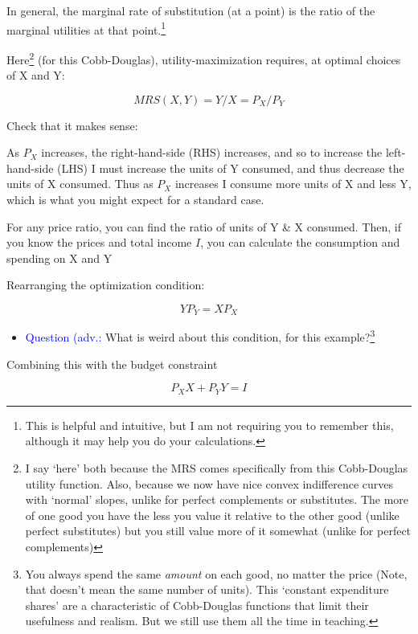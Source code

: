 \documentclass[]{article}
\providecommand{\tightlist}{%
  \setlength{\itemsep}{0pt}\setlength{\parskip}{0pt}}
\begin{document}
In general, the marginal rate of substitution (at a point) is the ratio
of the marginal utilities at that point.\footnote{This is helpful and
  intuitive, but I am not requiring you to remember this, although it
  may help you do your calculations.}

Here\footnote{I say `here' both because the MRS comes specifically from
  this Cobb-Douglas utility function. Also, because we now have nice
  convex indifference curves with `normal' slopes, unlike for perfect
  complements or substitutes. The more of one good you have the less you
  value it relative to the other good (unlike perfect substitutes) but
  you still value more of it somewhat (unlike for perfect complements)}
(for this Cobb-Douglas), utility-maximization requires, at optimal
choices of X and Y:

\[MRS(X,Y)= Y/X = P_X/P_Y\]

Check that it makes sense:

As \(P_X\) increases, the right-hand-side (RHS) increases, and so to
increase the left-hand-side (LHS) I must increase the units of Y
consumed, and thus decrease the units of X consumed. Thus as \(P_X\)
increases I consume more units of X and less Y, which is what you might
expect for a standard case.

\bigskip

For any price ratio, you can find the ratio of units of Y \& X consumed.
Then, if you know the prices and total income \(I\), you can calculate
the consumption and spending on X and Y

\bigskip

Rearranging the optimization condition:

\[Y P_Y = X P_X\]

\begin{itemize}
\tightlist
\item
  \textcolor{blue}{Question (adv.:} What is weird about this condition,
  for this example?\footnote{You always spend the same \emph{amount} on
    each good, no matter the price (Note, that doesn't mean the same
    number of units). This `constant expenditure shares' are a
    characteristic of Cobb-Douglas functions that limit their usefulness
    and realism. But we still use them all the time in teaching.}
\end{itemize}

\bigskip

Combining this with the budget constraint

\[P_X X + P_Y Y = I\]
\end{document}
